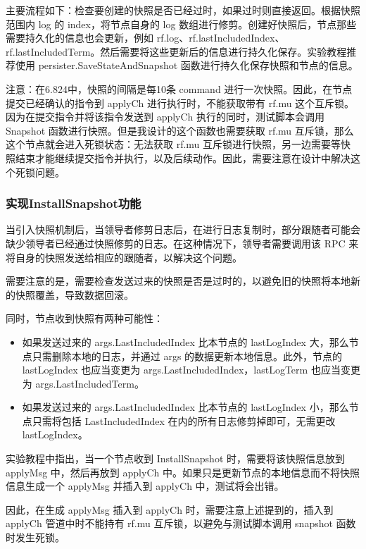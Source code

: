 \documentclass[]{article}
\begin{document}
	主要流程如下：检查要创建的快照是否已经过时，如果过时则直接返回。根据快照范围内 log 的 index，将节点自身的 log 数组进行修剪。创建好快照后，节点那些需要持久化的信息也会更新，例如 rf.log、rf.lastIncludedIndex、rf.lastIncludedTerm。然后需要将这些更新后的信息进行持久化保存。实验教程推荐使用 persister.SaveStateAndSnapshot 函数进行持久化保存快照和节点的信息。
	
	注意：在6.824中，快照的间隔是每10条 command 进行一次快照。因此，在节点提交已经确认的指令到 applyCh 进行执行时，不能获取带有 rf.mu 这个互斥锁。因为在提交指令并将该指令发送到 applyCh 执行的同时，测试脚本会调用 Snapshot 函数进行快照。但是我设计的这个函数也需要获取 rf.mu 互斥锁，那么这个节点就会进入死锁状态：无法获取 rf.mu 互斥锁进行快照，另一边需要等快照结束才能继续提交指令并执行，以及后续动作。因此，需要注意在设计中解决这个死锁问题。
	
	\subsubsection{实现InstallSnapshot功能}
	当引入快照机制后，当领导者修剪日志后，在进行日志复制时，部分跟随者可能会缺少领导者已经通过快照修剪的日志。在这种情况下，领导者需要调用该 RPC 来将自身的快照发送给相应的跟随者，以解决这个问题。
	
	需要注意的是，需要检查发送过来的快照是否是过时的，以避免旧的快照将本地新的快照覆盖，导致数据回滚。
	
	同时，节点收到快照有两种可能性：
	\begin{itemize}
	
		\item 如果发送过来的 args.LastIncludedIndex 比本节点的 lastLogIndex 大，那么节点只需删除本地的日志，并通过 args 的数据更新本地信息。此外，节点的 lastLogIndex 也应当变更为 args.LastIncludedIndex，lastLogTerm 也应当变更为 args.LastIncludedTerm。
	
		\item 如果发送过来的 args.LastIncludedIndex 比本节点的 lastLogIndex 小，那么节点只需将包括 LastIncludedIndex 在内的所有日志修剪掉即可，无需更改 lastLogIndex。

	\end{itemize}
	\par
	实验教程中指出，当一个节点收到 InstallSnapshot 时，需要将该快照信息放到 applyMsg 中，然后再放到 applyCh 中。如果只是更新节点的本地信息而不将快照信息生成一个 applyMsg 并插入到 applyCh 中，测试将会出错。
	
	因此，在生成 applyMsg 插入到 applyCh 时，需要注意上述提到的，插入到 applyCh 管道中时不能持有 rf.mu 互斥锁，以避免与测试脚本调用 snapshot 函数时发生死锁。
	
\end{document}
